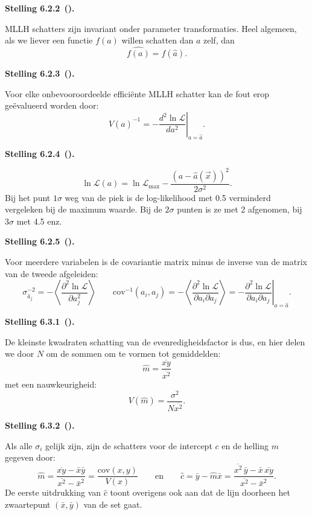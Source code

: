 \documentclass[10pt,a4paper]{article}
\newenvironment{res}[3][]{%
  \begin{tcolorbox}[
    breakable,          %
    colback=gray!10,    %
    colframe=gray!40,   %
    boxrule=0.5pt,      %
    left=6pt, right=6pt, top=6pt, bottom=6pt %
  ]
  \noindent\textbf{#2 #3}\if\relax\detokenize{#1}\relax\else\ \textbf{(#1)}\fi\textbf{.}~\ignorespaces
}{%
  \end{tcolorbox}
}
\begin{document}
\begin{res}{Stelling}{6.2.2}
MLLH schatters zijn invariant onder parameter transformaties. Heel algemeen, als we liever een functie $f(a)$ willen schatten dan $a$ zelf, dan
\[
\widehat{f(a)} = f(\hat a).
\]
\end{res}

\begin{res}{Stelling}{6.2.3}
Voor elke onbevooroordeelde effici\"ente MLLH schatter kan de fout erop ge\"evalueerd worden door:
\[
V(\hat a)^{-1} = -\left.\frac{d^2\ln\mathcal L}{da^2}\right|_{a=\hat a}.
\]
\end{res}

\begin{res}{Stelling}{6.2.4}
\[
\ln\mathcal L(a) = \ln\mathcal L_{\max} - \frac{(a-\hat a(\vec x))^2}{2\sigma^2}.
\]
Bij het punt $1\sigma$ weg van de piek is de log-likelihood met 0.5 verminderd vergeleken bij de maximum waarde. Bij de $2\sigma$ punten is ze met 2 afgenomen, bij $3\sigma$ met 4.5 enz.
\end{res}

\begin{res}{Stelling}{6.2.5}
Voor meerdere variabelen is de covariantie matrix minus de inverse van de matrix van de tweede afgeleiden:
\[
\sigma_{\hat a_j}^{-2} = -\left\langle \frac{\partial^2\ln\mathcal L}{\partial a_j^2}\right\rangle \qquad \mathrm{cov}^{-1}(a_i,a_j) = -\left\langle \frac{\partial^2\ln\mathcal L}{\partial a_i\partial a_j}\right\rangle = -\left.\frac{\partial^2\ln\mathcal L}{\partial a_i\partial a_j}\right|_{a=\hat a}.
\]
\end{res}

\begin{res}{Stelling}{6.3.1}
De kleinste kwadraten schatting van de evenredigheidsfactor is dus, en hier delen we door $N$ om de sommen om te vormen tot gemiddelden:
\[
\hat m = \frac{\overline{xy}}{\overline{x^2}}
\]
met een nauwkeurigheid:
\[
V(\hat m) = \frac{\sigma^2}{N\overline{x^2}}.
\]
\end{res}

\begin{res}{Stelling}{6.3.2}
Als alle $\sigma_i$ gelijk zijn, zijn de schatters voor de intercept $c$ en de helling $m$ gegeven door:
\[
\hat m = \frac{\overline{xy}-\bar x\bar y}{\overline{x^2}-\bar x^2} = \frac{\mathrm{cov}(x,y)}{V(x)} \qquad\text{en}\qquad \hat c = \bar y - \hat m\bar x = \frac{\overline{x^2}\,\bar y - \bar x\,\overline{xy}}{\overline{x^2}-\bar x^2}.
\]
De eerste uitdrukking van $\hat c$ toont overigens ook aan dat de lijn doorheen het zwaartepunt $(\bar x,\bar y)$ van de set gaat.
\end{res}
\end{document}
